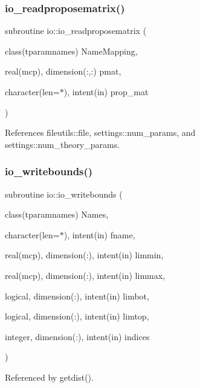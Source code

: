 \subsubsection{\texorpdfstring{io\+\_\+readproposematrix()}{io\_readproposematrix()}}
{\footnotesize\ttfamily subroutine io\+::io\+\_\+readproposematrix (\begin{DoxyParamCaption}\item[{class(tparamnames)}]{Name\+Mapping,  }\item[{real(mcp), dimension(\+:,\+:)}]{pmat,  }\item[{character(len=$\ast$), intent(in)}]{prop\+\_\+mat }\end{DoxyParamCaption})}



References fileutils\+::file, settings\+::num\+\_\+params, and settings\+::num\+\_\+theory\+\_\+params.

\mbox{\label{namespaceio_a767aeea14da167ae9027cac1b5b0a021}} 
\subsubsection{\texorpdfstring{io\+\_\+writebounds()}{io\_writebounds()}}
{\footnotesize\ttfamily subroutine io\+::io\+\_\+writebounds (\begin{DoxyParamCaption}\item[{class(tparamnames)}]{Names,  }\item[{character(len=$\ast$), intent(in)}]{fname,  }\item[{real(mcp), dimension(\+:), intent(in)}]{limmin,  }\item[{real(mcp), dimension(\+:), intent(in)}]{limmax,  }\item[{logical, dimension(\+:), intent(in)}]{limbot,  }\item[{logical, dimension(\+:), intent(in)}]{limtop,  }\item[{integer, dimension(\+:), intent(in)}]{indices }\end{DoxyParamCaption})}



Referenced by getdist().

